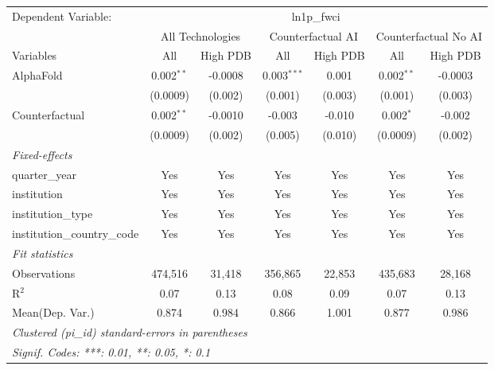 \begingroup
\centering
\begin{tabular}{lcccccc}
   \tabularnewline \midrule \midrule
   Dependent Variable: & \multicolumn{6}{c}{ln1p\_fwci}\\
 & \multicolumn{2}{c}{All Technologies} & \multicolumn{2}{c}{Counterfactual AI} & \multicolumn{2}{c}{Counterfactual No AI} \\
\cmidrule(lr){1-1}\cmidrule(lr){2-3} \cmidrule(lr){4-5} \cmidrule(lr){6-7}
Variables & \multicolumn{1}{c}{All} & \multicolumn{1}{c}{High PDB} & \multicolumn{1}{c}{All} & \multicolumn{1}{c}{High PDB} & \multicolumn{1}{c}{All} & \multicolumn{1}{c}{High PDB} \\
\cmidrule(lr){1-1}\cmidrule(lr){2-2} \cmidrule(lr){3-3} \cmidrule(lr){4-4} \cmidrule(lr){5-5} \cmidrule(lr){6-6} \cmidrule(lr){7-7}
   AlphaFold                    & 0.002$^{**}$ & -0.0008 & 0.003$^{***}$ & 0.001   & 0.002$^{**}$ & -0.0003\\   
                                & (0.0009)     & (0.002) & (0.001)       & (0.003) & (0.001)      & (0.003)\\   
   Counterfactual               & 0.002$^{**}$ & -0.0010 & -0.003        & -0.010  & 0.002$^{*}$  & -0.002\\   
                                & (0.0009)     & (0.002) & (0.005)       & (0.010) & (0.0009)     & (0.002)\\   
   \midrule
   \emph{Fixed-effects}\\
   quarter\_year                & Yes          & Yes     & Yes           & Yes     & Yes          & Yes\\  
   institution                  & Yes          & Yes     & Yes           & Yes     & Yes          & Yes\\  
   institution\_type            & Yes          & Yes     & Yes           & Yes     & Yes          & Yes\\  
   institution\_country\_code   & Yes          & Yes     & Yes           & Yes     & Yes          & Yes\\  
   \midrule
   \emph{Fit statistics}\\
   Observations                 & 474,516      & 31,418  & 356,865       & 22,853  & 435,683      & 28,168\\  
   R$^2$                        & 0.07         & 0.13    & 0.08          & 0.09    & 0.07         & 0.13\\  
Mean(Dep. Var.) & 0.874 & 0.984 & 0.866 & 1.001 & 0.877 & 0.986 \\
   \midrule \midrule
   \multicolumn{7}{l}{\emph{Clustered (pi\_id) standard-errors in parentheses}}\\
   \multicolumn{7}{l}{\emph{Signif. Codes: ***: 0.01, **: 0.05, *: 0.1}}\\
\end{tabular}
\par\endgroup
